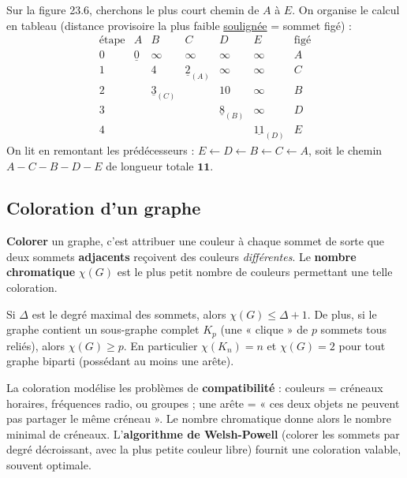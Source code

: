 \begin{exemple}
Sur la figure 23.6, cherchons le plus court chemin de $A$ à $E$. On organise le calcul en
tableau (distance provisoire la plus faible \underline{soulignée} = sommet figé) :
\[
\begin{array}{c|ccccc|l}
\text{étape} & A & B & C & D & E & \text{figé}\\\hline
0 & \underline{0} & \infty & \infty & \infty & \infty & A\\
1 & & 4 & \underline{2}_{(A)} & \infty & \infty & C\\
2 & & \underline{3}_{(C)} & & 10 & \infty & B\\
3 & & & & \underline{8}_{(B)} & \infty & D\\
4 & & & & & \underline{11}_{(D)} & E
\end{array}
\]
On lit en remontant les prédécesseurs : $E\leftarrow D\leftarrow B\leftarrow C\leftarrow A$,
soit le chemin $A-C-B-D-E$ de longueur totale $\mathbf{11}$.
\end{exemple}

\subsection{Coloration d'un graphe}

\begin{definition}
\textbf{Colorer} un graphe, c'est attribuer une couleur à chaque sommet de sorte que deux
sommets \textbf{adjacents} reçoivent des couleurs \emph{différentes}. Le \textbf{nombre
chromatique} $\chi(G)$ est le plus petit nombre de couleurs permettant une telle coloration.
\end{definition}

\begin{propriete}
Si $\Delta$ est le degré maximal des sommets, alors $\chi(G)\le \Delta+1$. De plus, si le
graphe contient un sous-graphe complet $K_p$ (une « clique » de $p$ sommets tous reliés),
alors $\chi(G)\ge p$. En particulier $\chi(K_n)=n$ et $\chi(G)=2$ pour tout graphe biparti
(possédant au moins une arête).
\end{propriete}

\begin{remarque}
La coloration modélise les problèmes de \textbf{compatibilité} : couleurs = créneaux
horaires, fréquences radio, ou groupes ; une arête = « ces deux objets ne peuvent pas
partager le même créneau ». Le nombre chromatique donne alors le nombre minimal de créneaux.
L'\textbf{algorithme de Welsh-Powell} (colorer les sommets par degré décroissant, avec la
plus petite couleur libre) fournit une coloration valable, souvent optimale.
\end{remarque}

